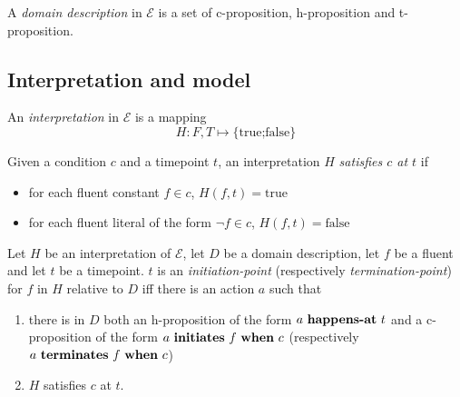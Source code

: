 \begin{definition}
  A \emph{domain description} in $\mathcal{E}$ is a set of c-proposition, h-proposition and t-proposition.
\end{definition}

\subsection{Interpretation and model}

\begin{definition}[interpretation]
  An \emph{interpretation} in $\mathcal{E}$ is a mapping
  $$H:F,T \mapsto \{ \text{true;false} \}$$
\end{definition}

\begin{definition}
  Given a condition $c$ and a timepoint $t$, an interpretation $H$ \emph{satisfies $c$ at $t$} if
  \begin{itemize}
    \item for each fluent constant $f\in c$, $H(f,t)=\text{true}$
    \item for each fluent literal of the form $\neg f\in c$, $H(f,t)=\text{false}$
  \end{itemize}
\end{definition}

\begin{definition}
  Let $H$ be an interpretation of $\mathcal{E}$, let $D$ be a domain description, let $f$ be a fluent and let $t$ be a timepoint. $t$ is an \emph{initiation-point} (respectively \emph{termination-point}) for $f$ in $H$ relative to $D$ iff there is an action $a$ such that
  \begin{enumerate}
    \item there is in $D$ both an h-proposition of the form $a \text{  \textbf{happens-at} } t$ and a c-proposition of the form $a \text{ \textbf{initiates} } f \text{  \textbf{when} } c$ (respectively $a \text{ \textbf{terminates} } f \text{  \textbf{when} } c$)
    \item $H$ satisfies $c$ at $t$.
  \end{enumerate}
\end{definition}


